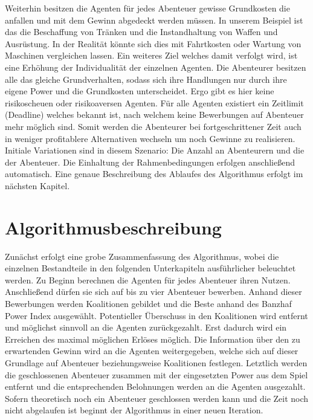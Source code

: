 \documentclass[fleqn,10pt]{SelfArx} %
\begin{document}
Weiterhin besitzen die Agenten für jedes Abenteuer gewisse Grundkosten die anfallen und mit dem Gewinn abgedeckt werden müssen. In unserem Beispiel ist das die Beschaffung von Tränken und die Instandhaltung von Waffen und Ausrüstung. In der Realität könnte sich dies mit Fahrtkosten oder Wartung von Maschinen vergleichen lassen. Ein weiteres Ziel welches damit verfolgt wird, ist eine Erhöhung der Individualität der einzelnen Agenten. Die Abenteurer besitzen alle das gleiche Grundverhalten, sodass sich ihre Handlungen nur durch ihre eigene Power und die Grundkosten unterscheidet. Ergo gibt es hier keine risikoscheuen oder risikoaversen Agenten. Für alle Agenten existiert ein Zeitlimit (Deadline) welches bekannt ist, nach welchem keine Bewerbungen auf Abenteuer mehr möglich sind. Somit werden die Abenteurer bei fortgeschrittener Zeit auch in weniger profitablere Alternativen wechseln um noch Gewinne zu realisieren.\\
Initiale Variationen sind in diesem Szenario: Die Anzahl an Abenteurern und die der Abenteuer. Die Einhaltung der Rahmenbedingungen erfolgen anschließend automatisch. Eine genaue Beschreibung des Ablaufes des Algorithmus erfolgt im nächsten Kapitel.\\



\section{Algorithmusbeschreibung}
\label{sec:Algorithmus}
Zunächst erfolgt eine grobe Zusammenfassung des Algorithmus, wobei die einzelnen Bestandteile in den folgenden Unterkapiteln ausführlicher beleuchtet werden. Zu Beginn berechnen die Agenten für jedes Abenteuer ihren Nutzen. Anschließend dürfen sie sich auf bis zu vier Abenteuer bewerben. Anhand dieser Bewerbungen werden Koalitionen gebildet und die Beste anhand des Banzhaf Power Index ausgewählt. Potentieller Überschuss in den Koalitionen wird entfernt und möglichst sinnvoll an die Agenten zurückgezahlt. Erst dadurch wird ein Erreichen des maximal möglichen Erlöses möglich. Die Information über den zu erwartenden Gewinn wird an die Agenten weitergegeben, welche sich auf dieser Grundlage auf Abenteuer beziehungsweise Koalitionen festlegen. Letztlich werden die geschlossenen Abenteuer zusammen mit der eingesetzten Power aus dem Spiel entfernt und die entsprechenden Belohnungen werden an die Agenten ausgezahlt. Sofern theoretisch noch ein Abenteuer geschlossen werden kann und die Zeit noch nicht abgelaufen ist beginnt der Algorithmus in einer neuen Iteration.
\end{document}
